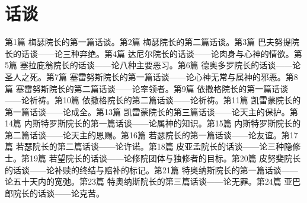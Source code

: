 
\chapter{话谈}


第1篇 梅瑟院长的第一篇话谈。\newline{}第2篇 梅瑟院长的第二篇话谈。\newline{}第3篇 巴夫努提院长的话谈——论三种弃绝。\newline{}第4篇 达尼尔院长的话谈——论肉身与心神的情欲。\newline{}第5篇 塞拉庇翁院长的话谈——论八种主要恶习。\newline{}第6篇 德奥多罗院长的话谈——论圣人之死。\newline{}第7篇 塞雷努斯院长的第一篇话谈——论心神无常与属神的邪恶。\newline{}第8篇 塞雷努斯院长的第二篇话谈——论率领者。\newline{}第9篇 依撒格院长的第一篇话谈——论祈祷。\newline{}第10篇 依撒格院长的第二篇话谈——论祈祷。\newline{}第11篇 凯雷蒙院长的第一篇话谈——论成全。\newline{}第13篇 凯雷蒙院长的第三篇话谈——论天主的保护。\newline{}第14篇 内斯特罗斯院长的第一篇话谈——论属神的知识。\newline{}第15篇 内斯特罗斯院长的第二篇话谈——论天主的恩赐。\newline{}第16篇 若瑟院长的第一篇话谈——论友谊。\newline{}第17篇 若瑟院长的第二篇话谈——论许诺。\newline{}第18篇 皮亚孟院长的话谈——论三种隐修士。\newline{}第19篇 若望院长的话谈——论修院团体与独修者的目标。\newline{}第20篇 皮努斐院长的话谈——论补赎的终结与赔补的标记。\newline{}第21篇 特奥纳斯院长的第一篇话谈——论五十天内的宽弛。\newline{}第23篇 特奥纳斯院长的第三篇话谈——论无罪。\newline{}第24篇 亚巴郎院长的话谈——论克苦。\par


